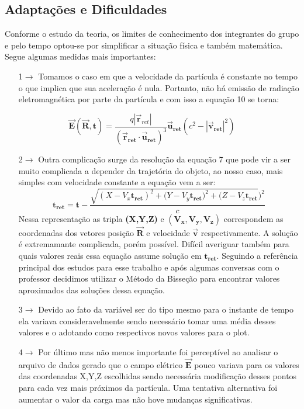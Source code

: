 \documentclass{article}
\begin{document}
\subsection{Adaptações e Dificuldades}
\hspace{0.45cm}Conforme o estudo da teoria, os limites de conhecimento dos integrantes do grupo e pelo tempo optou-se por simplificar a situação física e também matemática. Segue algumas medidas mais importantes:
\begin{itemize}
    \item[1$\xrightarrow{}$] Tomamos o caso em que a velocidade da partícula é constante no tempo o que implica que sua aceleração é nula. Portanto, não há emissão de radiação eletromagnética por parte da partícula e com isso a equação 10 se torna:
\end{itemize}

\begin{equation}
    \vec{\mathbf{E}}(\vec{\mathbf{R}}, \mathbf{t}) = \frac{q|\vec{\mathbf{r}}_{ret}|}{(\vec{\mathbf{r}}_\mathbf{ret} \cdot \vec{\mathbf{u}}_\mathbf{ret})^3}\vec{\mathbf{u}}_\mathbf{ret}(c^2 - |\vec{\mathbf{v}}_\mathbf{ret}|^2)
\end{equation}
\begin{itemize}
    \item[2$\xrightarrow{}$] Outra complicação surge da resolução da equação 7 que pode vir a ser muito complicada a depender da trajetória do objeto, ao nosso caso, mais simples com velocidade constante a equação vem a ser:
    \begin{equation}
        \mathbf{t_{ret}} = \mathbf{t} - \frac{\sqrt{(X-V_{x}\mathbf{t_{ret}})^2 + (Y-V_y\mathbf{t_{ret})}^2 + (Z-V_z\mathbf{t_{ret}}})^2}{c}
    \end{equation}
    Nessa representação as tripla \textbf{(X,Y,Z)} e $\mathbf{(V_{x}, V_{y}, V_{z})}$ correspondem as coordenadas dos vetores posição $\vec{\mathbf{R}}$ e velocidade $\vec{\mathbf{v}}$ respectivamente.
    A solução é extremamante complicada, porém possível. Difícil averiguar também para quais valores reais essa equação assume solução em  $\mathbf{t_{ret}}$. Seguindo a referência principal dos estudos para esse trabalho e após algumas conversas com o professor decidimos utilizar o Método da Bisseção para encontrar valores aproximados das soluções dessa equação.
    \item[3$\xrightarrow{}$] Devido ao fato da variável  ser do tipo  mesmo para o instante de tempo  ela variava consideravelmente sendo necessário tomar uma média desses valores e o adotando como respectivos novos valores para o plot.
    \item[4$\xrightarrow{}$] Por último mas não menos importante foi perceptível ao analisar o arquivo de dados gerado que o campo elétrico $\vec{\mathbf{E}}$ pouco variava para os valores das coordenadas X,Y,Z escolhidas sendo necessária modificação desses pontos para cada vez mais próximos da partícula. Uma tentativa alternativa foi aumentar o valor da carga mas não hove mudanças significativas.
\end{itemize}
\end{document}
